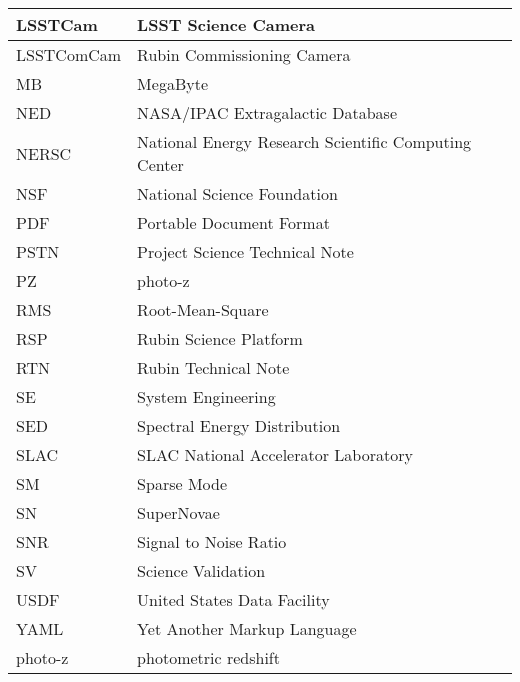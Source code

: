 \begin{longtable}{p{}p{}}
LSSTCam & LSST Science Camera \\\hline
LSSTComCam & Rubin Commissioning Camera \\\hline
MB & MegaByte \\\hline
NED & NASA/IPAC Extragalactic Database \\\hline
NERSC & National Energy Research Scientific Computing Center \\\hline
NSF & National Science Foundation \\\hline
PDF & Portable Document Format \\\hline
PSTN & Project Science Technical Note \\\hline
PZ & photo-z \\\hline
RMS & Root-Mean-Square \\\hline
RSP & Rubin Science Platform \\\hline
RTN & Rubin Technical Note \\\hline
SE & System Engineering \\\hline
SED & Spectral Energy Distribution \\\hline
SLAC & SLAC National Accelerator Laboratory \\\hline
SM & Sparse Mode \\\hline
SN & SuperNovae \\\hline
SNR & Signal to Noise Ratio \\\hline
SV & Science Validation \\\hline
USDF & United States Data Facility \\\hline
YAML & Yet Another Markup Language \\\hline
photo-z & photometric redshift \\\hline
\end{longtable}
